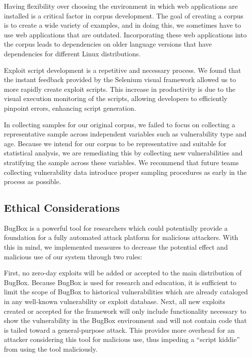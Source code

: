 \documentclass[letterpaper,twocolumn,10pt]{article}
\begin{document}
Having flexibility over choosing the environment in which web applications are installed is a critical factor in corpus development.  The goal of creating a corpus is to create a wide variety of examples, and in doing this, we sometimes have to use web applications that are outdated.  Incorporating these web applications into the corpus leads to dependencies on older language versions that have dependencies for different Linux distributions.\par

Exploit script development is a repetitive and necessary process. We found that the instant feedback provided by the Selenium visual framework allowed us to more rapidly create exploit scripts.  This increase in productivity is due to the visual execution monitoring of the scripts, allowing developers to efficiently pinpoint errors, enhancing script generation.  \par

In collecting samples for our original corpus, we failed to focus on collecting a representative sample across independent variables such as vulnerability type and age. Because we intend for our corpus to be representative and suitable for statistical analysis, we are remediating this by collecting new vulnerabilities and stratifying the sample across these variables. We recommend that future teams collecting vulnerability data introduce proper sampling procedures as early in the process as possible.\par

\subsection {Ethical Considerations}
BugBox is a powerful tool for researchers which could potentially provide a foundation for a fully automated attack platform for malicious attackers.  With this in mind, we implemented measures to decrease the potential effect and malicious use of our system through two rules:

First, no zero-day exploits will be added or accepted to the main distribution of BugBox. Because BugBox is used for research and education, it is sufficient to limit the scope of BugBox to historical vulnerabilities which are already cataloged in any well-known vulnerability or exploit database.
Next, all new exploits created or accepted for the framework will only include functionality necessary to show the vulnerability in the BugBox environment and will not contain code that is tailed toward a general-purpose attack.  This provides more overhead for an attacker considering this tool for malicious use, thus impeding a ``script kiddie'' from using the tool maliciously.  
\end{document}
